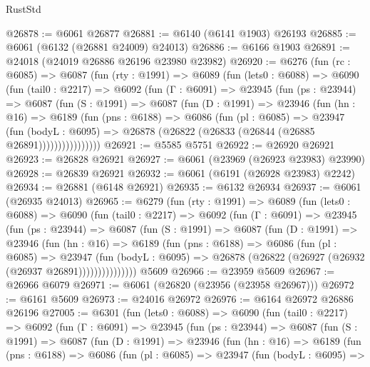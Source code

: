 \begin{lexlean}{RustStd}
\begin{coremodule}
@26878 := @6061 @26877
@26881 := @6140 (@6141 @1903) @26193
@26885 := @6061 (@6132 (@26881 @24009) @24013)
@26886 := @6166 @1903
@26891 := @24018 (@24019 @26886 @26196 @23980 @23982)
@26920 := @6276
    (fun (rc : @6085) =>
    @6087
      (fun (rty : @1991) =>
      @6089
        (fun (lets0 : @6088) =>
        @6090
          (fun (tail0 : @2217) =>
          @6092
            (fun (Γ : @6091) =>
            @23945
              (fun (ps : @23944) =>
              @6087
                (fun (S : @1991) =>
                @6087
                  (fun (D : @1991) =>
                  @23946
                    (fun (hn : @16) =>
                    @6189
                      (fun (pns : @6188) =>
                      @6086
                        (fun (pl : @6085) =>
                        @23947
                          (fun (bodyL : @6095) =>
                          @26878 (@26822 (@26833 (@26844 (@26885 @26891))))))))))))))))
@26921 := @5585 @5751
@26922 := @26920 @26921
@26923 := @26828 @26921
@26927 := @6061 (@23969 (@26923 @23983) @23990)
@26928 := @26839 @26921
@26932 := @6061 (@6191 (@26928 @23983) @2242)
@26934 := @26881 (@6148 @26921)
@26935 := @6132 @26934
@26937 := @6061 (@26935 @24013)
@26965 := @6279
    (fun (rty : @1991) =>
    @6089
      (fun (lets0 : @6088) =>
      @6090
        (fun (tail0 : @2217) =>
        @6092
          (fun (Γ : @6091) =>
          @23945
            (fun (ps : @23944) =>
            @6087
              (fun (S : @1991) =>
              @6087
                (fun (D : @1991) =>
                @23946
                  (fun (hn : @16) =>
                  @6189
                    (fun (pns : @6188) =>
                    @6086
                      (fun (pl : @6085) =>
                      @23947
                        (fun (bodyL : @6095) =>
                        @26878 (@26822 (@26927 (@26932 (@26937 @26891)))))))))))))))
    @5609
@26966 := @23959 @5609
@26967 := @26966 @6079
@26971 := @6061 (@26820 (@23956 (@23958 @26967)))
@26972 := @6161 @5609
@26973 := @24016 @26972
@26976 := @6164 @26972 @26886 @26196
@27005 := @6301
    (fun (lets0 : @6088) =>
    @6090
      (fun (tail0 : @2217) =>
      @6092
        (fun (Γ : @6091) =>
        @23945
          (fun (ps : @23944) =>
          @6087
            (fun (S : @1991) =>
            @6087
              (fun (D : @1991) =>
              @23946
                (fun (hn : @16) =>
                @6189
                  (fun (pns : @6188) =>
                  @6086
                    (fun (pl : @6085) =>
                    @23947
                      (fun (bodyL : @6095) =>

\end{coremodule}
\end{lexlean}
